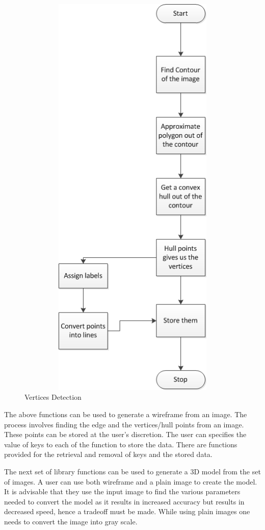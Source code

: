 \begin{figure} [ht] 
    \centering
    \includegraphics[width=20cm,height=20cm,keepaspectratio]{Pictures/VerticesDetection}
    \caption{Vertices Detection}
    \label{figurespecs1}
\end{figure}

The above functions can be used to generate a wireframe from an image. The process involves finding the edge and the vertices/hull points from an image. These points can be stored at the user's discretion. The user can specifies the value of keys to each of the function to store the data. There are functions provided for the retrieval and removal of keys and the stored data.

The next set of library functions can be used to generate a 3D model from the set of images. A user can use both wireframe and a plain image to create the model. It is advisable that they use the input image to find the various parameters needed to convert the model as it results in increased accuracy but results in decreased speed, hence a tradeoff must be made. While using plain images one needs to convert the image into gray scale.


